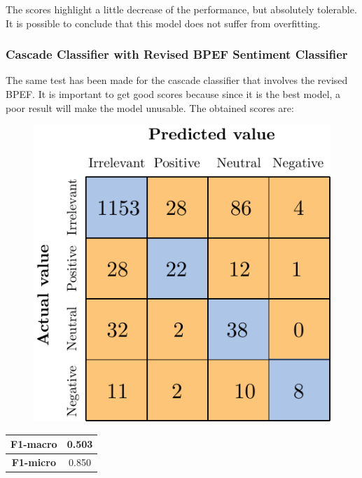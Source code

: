 The scores highlight a little decrease of the performance, but absolutely tolerable. It is possible to conclude that this model does not suffer from overfitting.


\subsubsection{Cascade Classifier with Revised BPEF Sentiment Classifier}

The same test has been made for the cascade classifier that involves the revised BPEF. It is important to get good scores because since it is the best model, a poor result will make the model unusable. The obtained scores are:

\begin{figure}[H]
	\centering
	\includegraphics[scale=1]{figures/conf_matrices/ita_cascade_bpef/ita_cascade_bpef_tst.pdf}
	\label{fig:ita_cascade_bpef_tst}
\end{figure}

\begin{center}
	\begin{tabular}{ | c | c | } 
		\hline
		\textbf{F1-macro} & 0.503 \\
		\hline
		\textbf{F1-micro} & 0.850 \\ 
		\hline
	\end{tabular}
\end{center}

